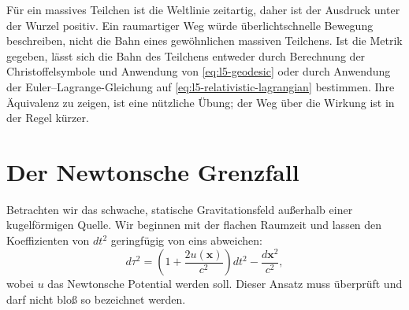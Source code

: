 \begin{classroomqa}
\end{classroomqa}

Für ein massives Teilchen ist die Weltlinie zeitartig, daher ist der Ausdruck unter der Wurzel positiv. Ein raumartiger Weg würde überlichtschnelle Bewegung beschreiben, nicht die Bahn eines gewöhnlichen massiven Teilchens. Ist die Metrik gegeben, lässt sich die Bahn des Teilchens entweder durch Berechnung der Christoffelsymbole und Anwendung von \eqref{eq:l5-geodesic} oder durch Anwendung der Euler--Lagrange-Gleichung auf \eqref{eq:l5-relativistic-lagrangian} bestimmen. Ihre Äquivalenz zu zeigen, ist eine nützliche Übung; der Weg über die Wirkung ist in der Regel kürzer.

\section{Der Newtonsche Grenzfall}

Betrachten wir das schwache, statische Gravitationsfeld außerhalb einer kugelförmigen Quelle. Wir beginnen mit der flachen Raumzeit und lassen den Koeffizienten von \(dt^2\) geringfügig von eins abweichen:
\begin{equation}
d\tau^2
=\left(1+\frac{2u(\mathbf{x})}{c^2}\right)dt^2
-\frac{d\mathbf{x}^2}{c^2},
\label{eq:l5-weak-metric}
\end{equation}
wobei \(u\) das Newtonsche Potential werden soll. Dieser Ansatz muss überprüft und darf nicht bloß so bezeichnet werden.

